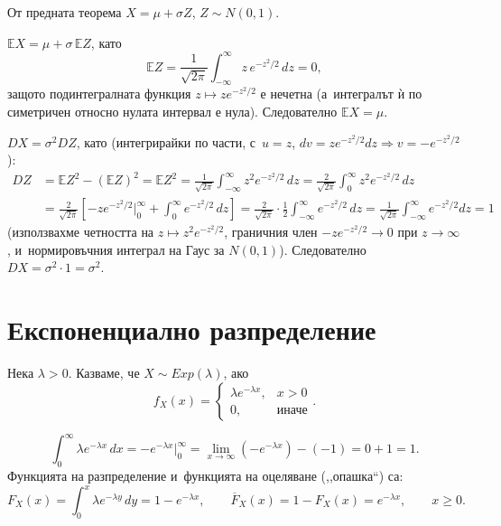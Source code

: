 \begin{proofbox}
От предната теорема $X=\mu+\sigma Z$, $Z\sim N(0,1)$.

$\mathbb EX = \mu+\sigma\,\mathbb EZ$, като
\[
  \mathbb EZ = \frac1{\sqrt{2\pi}}\int_{-\infty}^{\infty} z\,e^{-z^2/2}\,dz = 0,
\]
защото подинтегралната функция $z\mapsto ze^{-z^2/2}$ е нечетна (а~интегралът ѝ по симетричен относно нулата интервал е нула).
Следователно $\mathbb EX=\mu$.

$DX = \sigma^2 DZ$, като (интегрирайки по части, с~$u=z$,
$dv=ze^{-z^2/2}dz \Rightarrow v=-e^{-z^2/2}$):
\begin{align*}
  DZ &= \mathbb EZ^2-(\mathbb EZ)^2 = \mathbb EZ^2 = \frac1{\sqrt{2\pi}}\int_{-\infty}^{\infty}z^2e^{-z^2/2}\,dz = \frac{2}{\sqrt{2\pi}}\int_0^{\infty}z^2e^{-z^2/2}\,dz\\
  &= \frac{2}{\sqrt{2\pi}}\left[-ze^{-z^2/2}\Big|_0^{\infty} + \int_0^{\infty}e^{-z^2/2}\,dz\right] = \frac{2}{\sqrt{2\pi}}\cdot\frac1{2}\int_{-\infty}^{\infty}e^{-z^2/2}\,dz = \frac1{\sqrt{2\pi}}\int_{-\infty}^{\infty}e^{-z^2/2}dz = 1
\end{align*}
(използвахме четността на $z\mapsto z^2e^{-z^2/2}$, граничния член
$-ze^{-z^2/2}\to0$ при $z\to\infty$, и~нормировъчния интеграл на
Гаус за $N(0,1)$). Следователно $DX=\sigma^2\cdot1=\sigma^2$. \qedbg
\end{proofbox}

\section{Експоненциално разпределение}

\begin{defbox}
Нека $\lambda>0$. Казваме, че $X\sim Exp(\lambda)$, ако
\[
  f_X(x) = \begin{cases}\lambda e^{-\lambda x}, & x>0\\ 0, & \text{иначе}\end{cases}.
\]
\end{defbox}

\begin{rembox}
\[
  \int_0^{\infty}\lambda e^{-\lambda x}\,dx = -e^{-\lambda x}\Big|_0^{\infty} = \lim_{x\to\infty}(-e^{-\lambda x}) - (-1) = 0+1 = 1.
\]
Функцията на разпределение и~функцията на оцеляване (,,опашка``) са:
\[
  F_X(x) = \int_0^x \lambda e^{-\lambda y}\,dy = 1-e^{-\lambda x}, \qquad \overline{F}_X(x) = 1-F_X(x) = e^{-\lambda x}, \qquad x\ge0.
\]
\end{rembox}

